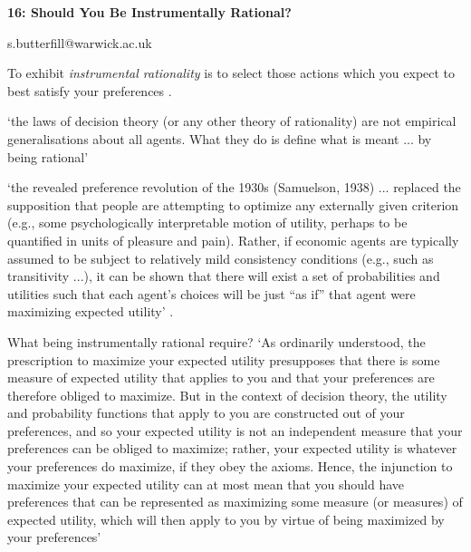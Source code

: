 \documentclass[12pt]{extarticle}
\date{}
\makeatletter
\def \ititle {Philosophical Psychology}
\def \iemail{s.butterfill@warwick.ac.uk}
\makeatother
\begin{document}
\begin{multicols*}{3}

\setlength\footnotesep{1em}










      
\def \ititle {16: Should You Be Instrumentally Rational?}
 
\begin{center}
 
{\Large
 
\textbf{\ititle}
 
}
 
 
 
\iemail %
 
\end{center}
 
To exhibit \emph{instrumental rationality} is to select those actions which you expect to best satisfy your preferences \citep[textbook:][]{Jeffrey:1983oe}.
 
 
‘the laws of decision theory (or any other theory of rationality) are not empirical generalisations 
about all agents. What they do is define what is meant ... by being rational’
\citep[p.~43]{Davidson:1987wc}

‘the revealed preference revolution of the 1930s (Samuelson, 1938)
  ... replaced the supposition that people are attempting to
  optimize any externally given criterion (e.g., some psychologically 
  interpretable motion of utility, perhaps to be quantified in units of pleasure and
  pain). 
  Rather, if economic agents are typically assumed to be subject to
  relatively mild consistency conditions (e.g., such as transitivity ...), 
  it can be
  shown that there will exist a set of probabilities and utilities such that each
  agent’s choices will be just “as if” that agent were maximizing expected
  utility’
  \citep{chater:2014_cognitive}.
 
What being instrumentally rational require?
‘As ordinarily understood, the prescription to maximize your expected utility
presupposes that there is some measure of expected utility that applies to you
and that your preferences are therefore obliged to maximize.
But in the context
of decision  theory, the utility and probability functions that apply to you are constructed
out of your preferences, and so your expected utility is not an independent
measure that your preferences can be obliged to maximize;
rather, your
expected utility is whatever your preferences do maximize, if they obey the
axioms.
Hence, the injunction to maximize your expected utility can at most
mean that you should have preferences that can be represented as maximizing
some measure (or measures) of expected utility, which will then apply to you by
virtue of being maximized by your preferences’
\citep[p.~149]{Velleman:2000fq}
 

\end{multicols*}
\end{document}
